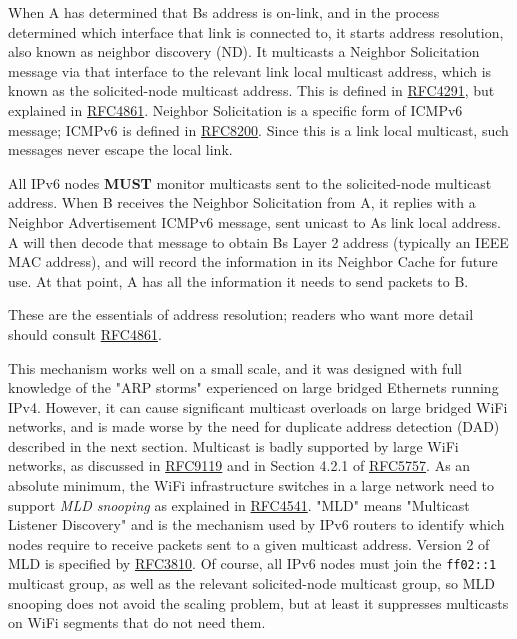 \documentclass[
]{article}
\begin{document}
When A has determined that B\textquotesingle s address is on-link, and
in the process determined which interface that link is connected to, it
starts address resolution, also known as neighbor discovery (ND). It
multicasts a Neighbor Solicitation message via that interface to the
relevant link local multicast address, which is known as the
solicited-node multicast address. This is defined in
\href{https://www.rfc-editor.org/info/rfc4291}{RFC4291}, but explained
in \href{https://www.rfc-editor.org/info/rfc4861}{RFC4861}. Neighbor
Solicitation is a specific form of ICMPv6 message; ICMPv6 is defined in
\href{https://www.rfc-editor.org/info/rfc8200}{RFC8200}. Since this is a
link local multicast, such messages never escape the local link.

All IPv6 nodes \textbf{MUST} monitor multicasts sent to the
solicited-node multicast address. When B receives the Neighbor
Solicitation from A, it replies with a Neighbor Advertisement ICMPv6
message, sent unicast to A\textquotesingle s link local address. A will
then decode that message to obtain B\textquotesingle s Layer 2 address
(typically an IEEE MAC address), and will record the information in its
Neighbor Cache for future use. At that point, A has all the information
it needs to send packets to B.

These are the essentials of address resolution; readers who want more
detail should consult
\href{https://www.rfc-editor.org/info/rfc4861}{RFC4861}.

This mechanism works well on a small scale, and it was designed with
full knowledge of the "ARP storms" experienced on large bridged
Ethernets running IPv4. However, it can cause significant multicast
overloads on large bridged WiFi networks, and is made worse by the need
for duplicate address detection (DAD) described in the next section.
Multicast is badly supported by large WiFi networks, as discussed in
\href{https://www.rfc-editor.org/info/rfc9119}{RFC9119} and in Section
4.2.1 of \href{https://www.rfc-editor.org/info/rfc5757}{RFC5757}. As an
absolute minimum, the WiFi infrastructure switches in a large network
need to support \emph{MLD snooping} as explained in
\href{https://www.rfc-editor.org/info/rfc4541}{RFC4541}. "MLD" means
"Multicast Listener Discovery" and is the mechanism used by IPv6 routers
to identify which nodes require to receive packets sent to a given
multicast address. Version 2 of MLD is specified by
\href{https://www.rfc-editor.org/info/rfc3810}{RFC3810}. Of course, all
IPv6 nodes must join the \texttt{ff02::1} multicast group, as well as
the relevant solicited-node multicast group, so MLD snooping does not
avoid the scaling problem, but at least it suppresses multicasts on WiFi
segments that do not need them.
\end{document}
